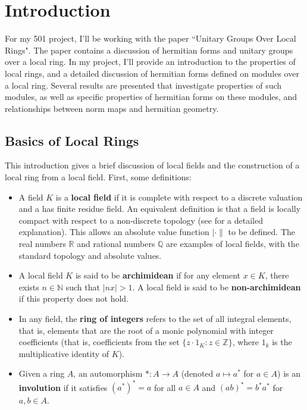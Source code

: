 \section{Introduction}

For my 501 project, I'll be working with the paper ``Unitary Groups Over Local Rings"\cite{cruickshank}.
The paper contains a discussion of hermitian forms and unitary groups over a local ring.
In my project, I'll provide an introduction to the properties of local rings, and a detailed discussion of hermitian forms
defined on modules over a local ring.
Several results are presented that investigate properties of such modules, as well as specific properties of hermitian forms on these modules,
and relationships between norm maps and hermitian geometry.

\subsection{Basics of Local Rings}

This introduction gives a brief discussion of local fields and the construction of a local ring from a local field.
First, some definitions:

\begin{itemize}
\item A field $K$ is a \textbf{local field} if it is complete with respect to a discrete valuation and a has finite residue field.
An equivalent definition is that a field is locally compact with respect to a non-discrete topology (see \cite{serre} for a detailed explanation).
This allows an absolute value function $|\cdot\|$ to be defined.
The real numbers $\mathbb{R}$ and rational numbers $\mathbb{Q}$ are examples of local fields, with the standard topology and absolute values.

\item A local field $K$ is said to be \textbf{archimidean} if for any element $x \in K$, there exists $n \in \mathbb{N}$ such that $|nx| > 1$.
A local field is said to be \textbf{non-archimidean} if this property does not hold.

\item In any field, the \textbf{ring of integers} refers to the set of all integral elements, that is, 
elements that are the root of a monic polynomial with integer coefficients 
(that is, coefficients from the set $\{z \cdot 1_K : z \in \mathbb{Z} \}$, where $1_k$ is the multiplicative identity of $K$).

\item Given a ring $A$, an automorphism $*: A \to A$ (denoted $a \mapsto a^*$ for $a \in A$) is an \textbf{involution} 
if it satisfies $(a^*)^* = a$ for all $a \in A$ and $(ab)^* = b^* a^*$ for $a, b \in A$.
\end{itemize}

